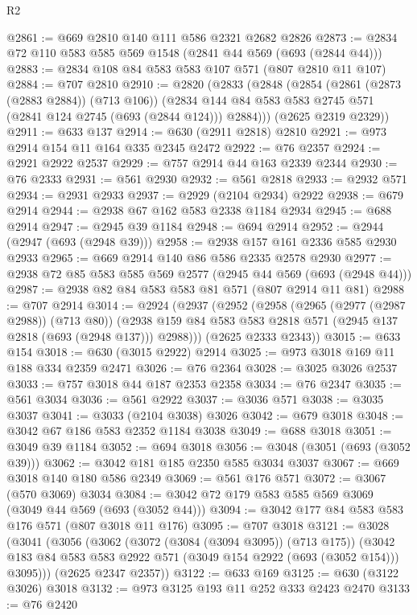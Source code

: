 \begin{lexlean}{R2}
\begin{coremodule}
@2861 := @669 @2810 @140 @111 @586 @2321 @2682 @2826
@2873 := @2834 @72 @110 @583 @585 @569 @1548 (@2841 @44 @569 (@693 (@2844 @44)))
@2883 := @2834 @108 @84 @583 @583 @107 @571 (@807 @2810 @11 @107)
@2884 := @707 @2810
@2910 := @2820
    (@2833
      (@2848
        (@2854
          (@2861 (@2873 (@2883 @2884)) (@713 @106))
          (@2834 @144 @84 @583 @583 @2745 @571 (@2841 @124 @2745 (@693 (@2844 @124))) @2884)))
      (@2625 @2319 @2329))
@2911 := @633 @137
@2914 := @630 (@2911 @2818) @2810
@2921 := @973 @2914 @154 @11 @164 @335 @2345 @2472
@2922 := @76 @2357
@2924 := @2921 @2922 @2537
@2929 := @757 @2914 @44 @163 @2339 @2344
@2930 := @76 @2333
@2931 := @561 @2930
@2932 := @561 @2818
@2933 := @2932 @571
@2934 := @2931 @2933
@2937 := @2929 (@2104 @2934) @2922
@2938 := @679 @2914
@2944 := @2938 @67 @162 @583 @2338 @1184 @2934
@2945 := @688 @2914
@2947 := @2945 @39 @1184
@2948 := @694 @2914
@2952 := @2944 (@2947 (@693 (@2948 @39)))
@2958 := @2938 @157 @161 @2336 @585 @2930 @2933
@2965 := @669 @2914 @140 @86 @586 @2335 @2578 @2930
@2977 := @2938 @72 @85 @583 @585 @569 @2577 (@2945 @44 @569 (@693 (@2948 @44)))
@2987 := @2938 @82 @84 @583 @583 @81 @571 (@807 @2914 @11 @81)
@2988 := @707 @2914
@3014 := @2924
    (@2937
      (@2952
        (@2958
          (@2965 (@2977 (@2987 @2988)) (@713 @80))
          (@2938 @159 @84 @583 @583 @2818 @571 (@2945 @137 @2818 (@693 (@2948 @137))) @2988)))
      (@2625 @2333 @2343))
@3015 := @633 @154
@3018 := @630 (@3015 @2922) @2914
@3025 := @973 @3018 @169 @11 @188 @334 @2359 @2471
@3026 := @76 @2364
@3028 := @3025 @3026 @2537
@3033 := @757 @3018 @44 @187 @2353 @2358
@3034 := @76 @2347
@3035 := @561 @3034
@3036 := @561 @2922
@3037 := @3036 @571
@3038 := @3035 @3037
@3041 := @3033 (@2104 @3038) @3026
@3042 := @679 @3018
@3048 := @3042 @67 @186 @583 @2352 @1184 @3038
@3049 := @688 @3018
@3051 := @3049 @39 @1184
@3052 := @694 @3018
@3056 := @3048 (@3051 (@693 (@3052 @39)))
@3062 := @3042 @181 @185 @2350 @585 @3034 @3037
@3067 := @669 @3018 @140 @180 @586 @2349
@3069 := @561 @176 @571
@3072 := @3067 (@570 @3069) @3034
@3084 := @3042 @72 @179 @583 @585 @569 @3069 (@3049 @44 @569 (@693 (@3052 @44)))
@3094 := @3042 @177 @84 @583 @583 @176 @571 (@807 @3018 @11 @176)
@3095 := @707 @3018
@3121 := @3028
    (@3041
      (@3056
        (@3062
          (@3072 (@3084 (@3094 @3095)) (@713 @175))
          (@3042 @183 @84 @583 @583 @2922 @571 (@3049 @154 @2922 (@693 (@3052 @154))) @3095)))
      (@2625 @2347 @2357))
@3122 := @633 @169
@3125 := @630 (@3122 @3026) @3018
@3132 := @973 @3125 @193 @11 @252 @333 @2423 @2470
@3133 := @76 @2420

\end{coremodule}
\end{lexlean}
